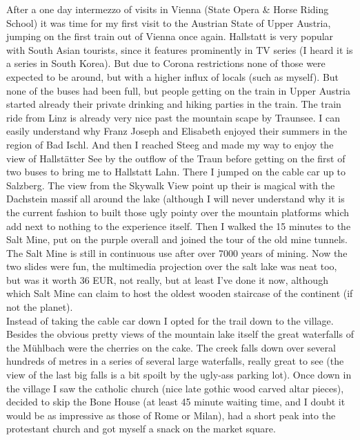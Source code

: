 After a one day intermezzo of visits in Vienna (State Opera \& Horse Riding School) it was time for my first visit to the Austrian State of Upper Austria, jumping on the first train out of Vienna once again. Hallstatt is very popular with South Asian tourists, since it features prominently in TV series (I heard it is a series in South Korea). But due to Corona restrictions none of those were expected to be around, but with a higher influx of locals (such as myself). But none of the buses had been full, but people getting on the train in Upper Austria started already their private drinking and hiking parties in the train. The train ride from Linz is already very nice past the mountain scape by Traunsee. I can easily understand why Franz Joseph and Elisabeth enjoyed their summers in the region of Bad Ischl. And then I reached Steeg and made my way to enjoy the view of Hallst\"atter See by the outflow of the Traun before getting on the first of two buses to bring me to Hallstatt Lahn. There I jumped on the cable car up to Salzberg. The view from the Skywalk View point up their is magical with the Dachstein massif all around the lake (although I will never understand why it is the current fashion to built those ugly pointy over the mountain platforms which add next to nothing to the experience itself. Then I walked the 15 minutes to the Salt Mine, put on the purple overall and joined the tour of the old mine tunnels. The Salt Mine is still in continuous use after over 7000 years of mining. Now the two slides were fun, the multimedia projection over the salt lake was neat too, but was it worth 36 EUR, not really, but at least I've done it now, although which Salt Mine can claim to host the oldest wooden staircase of the continent (if not the planet).\\
 Instead of taking the cable car down I opted for the trail down to the village. Besides the obvious pretty views of the mountain lake itself the great waterfalls of the M\"uhlbach were the cherries on the cake. The creek falls down over several hundreds of metres in a series of several large waterfalls, really great to see (the view of the last big falls is a bit spoilt by the ugly-ass parking lot). Once down in the village I saw the catholic church (nice late gothic wood carved altar pieces), decided to skip the Bone House (at least 45 minute waiting time, and I doubt it would be as impressive as those of Rome or Milan), had a short peak into the protestant church and got myself a snack on the market square.\\
